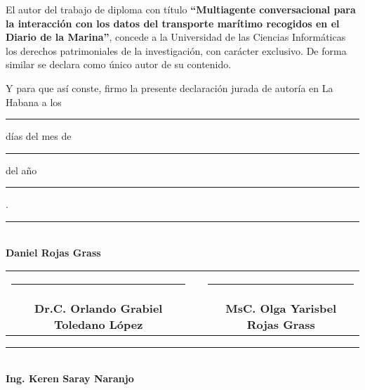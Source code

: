 \authorshipdeclared

\parskip 10pt 
\setlength{\parindent}{0pc}

El autor del trabajo de diploma con título  \textbf{“Multiagente conversacional para la interacción con los datos del transporte marítimo recogidos en el Diario de la Marina”}, concede a la Universidad de las Ciencias Informáticas los derechos patrimoniales de la investigación, con carácter exclusivo. De forma similar se declara como único autor de su contenido.

Y para que así conste, firmo la presente declaración jurada de autoría en La Habana a los \rule{8mm}{0.2mm} días del mes de \rule{30mm}{0.2mm} del año \rule{15mm}{0.2mm}.


\vspace{1in}

\begin{center}
	\rule{60mm}{0.3mm} \\
	\textbf{Daniel Rojas Grass}
\end{center}

\vspace{0.5in}

\begin{center}
	\begin{tabular}{cp{0.5in}c}		
		\rule{65mm}{0.3mm}      &   & \rule{65mm}{0.3mm}        \\
		\textbf{Dr.C. Orlando Grabiel Toledano López}      &   & \textbf{MsC. Olga Yarisbel Rojas Grass}
	\end{tabular}
\end{center}

\vspace{0.5in}

\begin{center}
	\rule{60mm}{0.3mm} \\
	\textbf{Ing. Keren Saray Naranjo}
\end{center}
